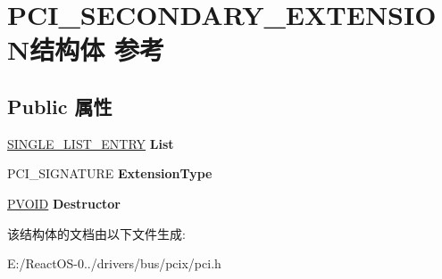 \hypertarget{struct_p_c_i___s_e_c_o_n_d_a_r_y___e_x_t_e_n_s_i_o_n}{}\section{P\+C\+I\+\_\+\+S\+E\+C\+O\+N\+D\+A\+R\+Y\+\_\+\+E\+X\+T\+E\+N\+S\+I\+O\+N结构体 参考}
\label{struct_p_c_i___s_e_c_o_n_d_a_r_y___e_x_t_e_n_s_i_o_n}
\subsection*{Public 属性}
\begin{DoxyCompactItemize}
\item 
\mbox{\label{struct_p_c_i___s_e_c_o_n_d_a_r_y___e_x_t_e_n_s_i_o_n_a03bc50e7e66f0e6491945f7fe75d5787}} 
\hyperlink{struct___s_i_n_g_l_e___l_i_s_t___e_n_t_r_y}{S\+I\+N\+G\+L\+E\+\_\+\+L\+I\+S\+T\+\_\+\+E\+N\+T\+RY} {\bfseries List}
\item 
\mbox{\label{struct_p_c_i___s_e_c_o_n_d_a_r_y___e_x_t_e_n_s_i_o_n_ad6b3c472b62e99e31947be47fde7888a}} 
P\+C\+I\+\_\+\+S\+I\+G\+N\+A\+T\+U\+RE {\bfseries Extension\+Type}
\item 
\mbox{\label{struct_p_c_i___s_e_c_o_n_d_a_r_y___e_x_t_e_n_s_i_o_n_afc4f447c551b54c8b1f28fe3a45998e7}} 
\hyperlink{interfacevoid}{P\+V\+O\+ID} {\bfseries Destructor}
\end{DoxyCompactItemize}


该结构体的文档由以下文件生成\+:\begin{DoxyCompactItemize}
\item 
E\+:/\+React\+O\+S-\/0../drivers/bus/pcix/pci.\+h\end{DoxyCompactItemize}
